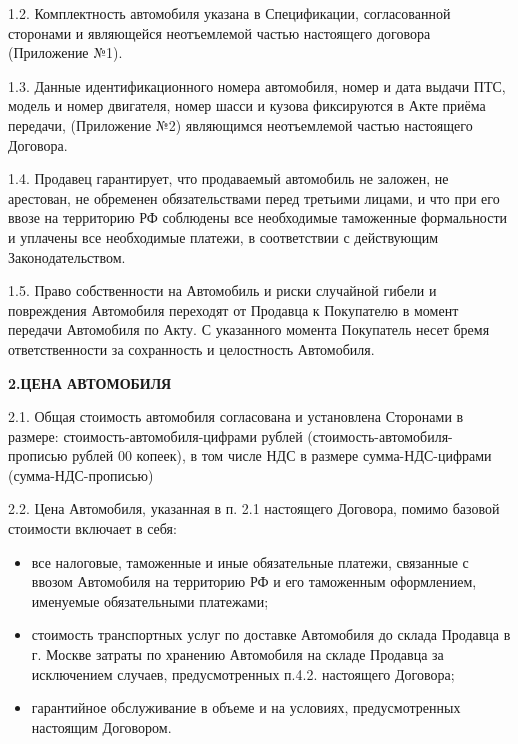 \documentclass[a4paper,12pt]{article}
\begin{document}
1.2. Комплектность автомобиля указана в Спецификации, согласованной сторонами и являющейся неотъемлемой частью настоящего договора (Приложение №1).

1.3. Данные идентификационного номера автомобиля, номер и дата выдачи ПТС, модель и номер двигателя, номер шасси и кузова фиксируются в Акте приёма передачи, (Приложение №2) являющимся неотъемлемой частью настоящего Договора.

1.4. Продавец гарантирует, что продаваемый автомобиль не заложен, не арестован, не обременен обязательствами перед третьими лицами, и что при его ввозе на территорию РФ соблюдены все необходимые таможенные формальности и уплачены все необходимые платежи, в соответствии с действующим Законодательством.

1.5. Право собственности на Автомобиль и риски случайной гибели и повреждения Автомобиля переходят от Продавца к Покупателю в момент передачи Автомобиля по Акту. С указанного момента Покупатель несет бремя ответственности за сохранность и целостность Автомобиля.

\newpage

\begin{center}
 \vspace{1 ex}
 \textbf{2.ЦЕНА АВТОМОБИЛЯ}
 \vspace{1ex}
    \end{center}
\begin{description}\item
2.1. Общая стоимость автомобиля согласована и установлена Сторонами в размере: стоимость-автомобиля-цифрами рублей
(стоимость-автомобиля-прописью рублей 00 копеек), в том числе НДС в размере сумма-НДС-цифрами (сумма-НДС-прописью)
\end{description}

\begin{description}\item
2.2. Цена Автомобиля, указанная в п. 2.1 настоящего Договора, помимо базовой стоимости включает в себя:\end{description}
 \begin{itemize}\item все налоговые, таможенные и иные обязательные платежи, связанные с ввозом Автомобиля на территорию РФ и его таможенным оформлением, именуемые обязательными платежами;\end{itemize}
 \begin{itemize}\item стоимость транспортных услуг по доставке Автомобиля до склада Продавца в г. Москве затраты по хранению Автомобиля на складе Продавца за исключением случаев, предусмотренных п.4.2. настоящего Договора;\end{itemize} 
 \begin{itemize}\item гарантийное обслуживание в объеме и на условиях, предусмотренных настоящим Договором.\end{itemize} 
  
\end{document}
